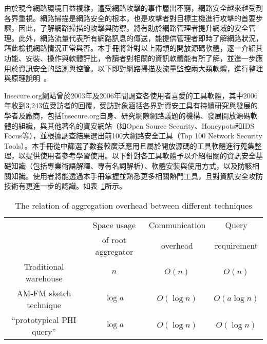 由於現今網路環境日益複雜，遭受網路攻擊的事件層出不窮，網路安全越來越受到各界重視。網路掃描是網路安全的根本，也是攻擊者對目標主機進行攻擊的首要步驟，因此，了解網路掃描的攻擊與防禦，將有助於網路管理者提升網域的安全管理。此外，網路流量代表所有網路訊息的傳送，能提供管理者即時了解網路狀況，藉此檢視網路情況正常與否。本手冊將針對以上兩類的開放源碼軟體，逐一介紹其功能、安裝、操作與軟體評比，令讀者對相關的資訊軟體能有所了解，並進一步應用於資訊安全的監測與控管。以下即對網路掃描及流量監控兩大類軟體，進行整理與原理說明~\cite{KotiVDSD07, SubrPPKG06, ShengLMJ07, Wagner04}。
	
Insecure.org網站曾於2003年及2006年間調查各使用者喜愛的工具軟體，其中2006年收到3,243位受訪者的回覆，受訪對象涵括各界對資安工具有持續研究與發展的學者及廠商，包括Insecure.org自身、研究網際網路議題的機構、發展開放源碼軟體的組織，與其他著名的資安網站（如Open Source Security、Honeypots和IDS Focus等），並根據調查結果選出前100大網路安全工具（Top 100 Network Security Tools）。本手冊從中篩選了數套較廣泛應用且屬於開放源碼的工具軟體進行蒐集整理，以提供使用者參考學習使用。以下針對各工具軟體予以介紹相關的資訊安全基礎知識（包括專業術語解釋、專有名詞解析）、軟體安裝與使用方式，以及防駭相關知識。使用者將能透過本手冊掌握並熟悉更多相關熱門工具，且對資訊安全攻防技術有更進一步的認識。如表~\ref{tab:system}所示。 


\begin{table}[t!]
  \begin{center}
    \caption{The relation of aggregation overhead between different techniques}
    \label{tab:system}
    \begin{tabular}{|c|c c c|}
      \hline
       & Space usage & Communication & Query \\
       & of root aggregator & overhead & requirement \\
      \hline
      Traditional warehouse & $n$ & $O(n)$ & $O(n)$ \\
      \hline
      AM-FM sketch technique & $\log a$ & $O(\log n)$ &  $O(a\log n)$ \\
      \hline
      ``prototypical PHI query'' & $\log a$ & $O(\log n)$ & $O(\log n)$ \\
      \hline
      \end{tabular}
  \end{center}
\end{table}
